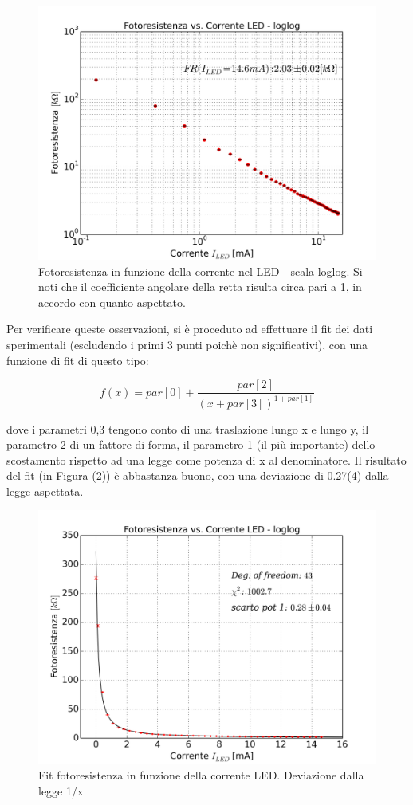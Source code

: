 \documentclass[journal, a4paper]{IEEEtran}
\begin{document}
\begin{figure}
\centering
\includegraphics[width=0.9\linewidth]{./plot_FR_vs_ill_loglog}
\caption{Fotoresistenza in funzione della corrente nel LED - scala loglog. Si noti che il coefficiente angolare della retta risulta circa pari a 1, in accordo con quanto aspettato.}
\label{fig:plot_FR_vs_ill_loglog}
\end{figure}

Per verificare queste osservazioni, si è proceduto ad effettuare il fit dei dati sperimentali (escludendo i primi 3 punti poichè non significativi), con una funzione di fit di questo tipo:

\begin{equation}
f(x) = par[0] + \frac{par[2]}{(x + par[3])^{1 + par[1]}}
\end{equation}

dove i parametri 0,3 tengono conto di una traslazione lungo x e lungo y, il parametro 2 di un fattore di forma, il parametro 1 (il più importante) dello scostamento rispetto ad una legge come potenza di x al denominatore. Il risultato del fit (in Figura (\ref{fig:fit_FR_vs_ill})) è abbastanza buono, con una deviazione di 0.27(4) dalla legge aspettata.

\begin{figure}
\centering
\includegraphics[width=0.9\linewidth]{./fit_FR_vs_ill}
\caption{Fit fotoresistenza in funzione della corrente LED. Deviazione dalla legge 1/x}
\label{fig:fit_FR_vs_ill}
\end{figure}
\end{document}
